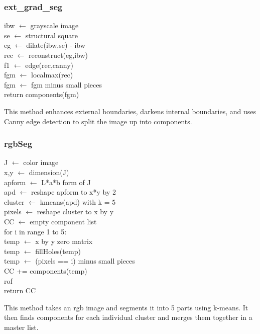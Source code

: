 \documentclass[12pt]{article}
\newcommand\tab[1][1cm]{\hspace*{#1}}
\begin{document}
\subsubsection*{ext\_grad\_seg}
\begin{addmargin}[12em]{1em}
	ibw $\leftarrow$ grayscale image \\
	se $\leftarrow$ structural square \\
	eg $\leftarrow$ dilate(ibw,se) - ibw \\
	rec $\leftarrow$ reconstruct(eg,ibw) \\
	f1 $\leftarrow$ edge(rec,canny) \\
	fgm $\leftarrow$ localmax(rec) \\
	fgm $\leftarrow$ fgm minus small pieces \\
	return components(fgm) \\
\end{addmargin}
This method enhances external boundaries, darkens internal boundaries, and uses Canny edge detection to split the image up into components.

\subsubsection*{rgbSeg}
\begin{addmargin}[12em]{1em}
	J $\leftarrow$ color image \\
	x,y $\leftarrow$ dimension(J) \\
	apform $\leftarrow$ L*a*b form of J \\
	apd $\leftarrow$ reshape apform to x*y by 2 \\
	cluster $\leftarrow$ kmeans(apd) with k = 5 \\
	pixels $\leftarrow$ reshape cluster to x by y \\
	CC $\leftarrow$ empty component list \\
	for i in range 1 to 5: \\
	\tab temp $\leftarrow$ x by y zero matrix \\
	\tab temp $\leftarrow$ fillHoles(temp) \\
	\tab temp $\leftarrow$ (pixels == i) minus small pieces \\
	\tab CC += components(temp) \\
	rof \\
	return CC \\
\end{addmargin}
This method takes an rgb image and segments it into 5 parts using k-means. It then finds components for each individual cluster and merges them together in a master list. 
\end{document}
